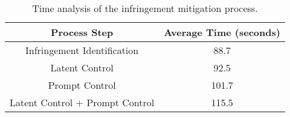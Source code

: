 \begin{table}[h]
    \centering
    \begin{footnotesize}
    \begin{tabular}{c|c}
        \hline
        Process Step & Average Time (seconds) \\
        \hline
        Infringement Identification  & 88.7 \\
        Latent Control  & 92.5 \\
        Prompt Control  & 101.7\\
        Latent Control + Prompt Control & 115.5 \\
        \hline
    \end{tabular}
    \caption{Time analysis of the infringement mitigation process.}
    \label{tab:time2}
    \end{footnotesize}
\end{table}


